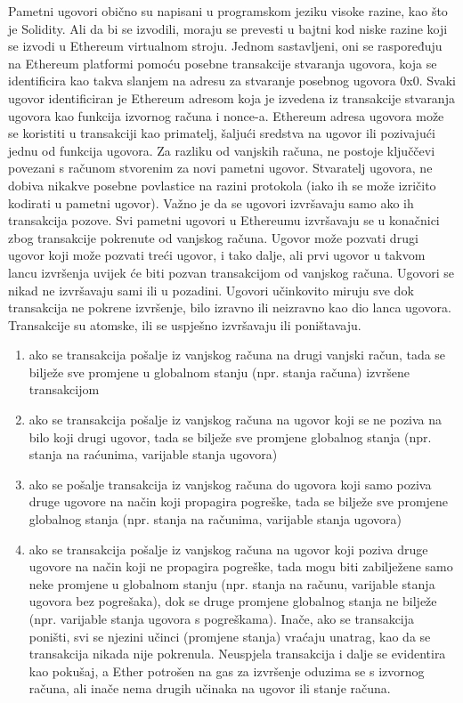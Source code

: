\documentclass[times, utf8, diplomski]{fer}
\begin{document}
Pametni ugovori obično su napisani u programskom jeziku visoke razine, kao što je Solidity. Ali da bi se izvodili, moraju se prevesti u bajtni kod niske razine koji se izvodi u Ethereum virtualnom stroju. Jednom sastavljeni, oni se raspoređuju na Ethereum platformi pomoću posebne transakcije stvaranja ugovora, koja se identificira kao takva slanjem na adresu za stvaranje posebnog ugovora 0x0. Svaki ugovor identificiran je Ethereum adresom koja je izvedena iz transakcije stvaranja ugovora kao funkcija izvornog računa i nonce-a. Ethereum adresa ugovora može se koristiti u transakciji kao primatelj, šaljući sredstva na ugovor ili pozivajući jednu od funkcija ugovora. Za razliku od vanjskih računa, ne postoje ključčevi povezani s računom stvorenim za novi
pametni ugovor. Stvaratelj ugovora, ne dobiva nikakve posebne povlastice na razini protokola (iako ih se može izričito kodirati u pametni ugovor).
Važno je da se ugovori izvršavaju samo ako ih transakcija pozove. Svi pametni ugovori u Ethereumu izvršavaju se u konačnici zbog transakcije pokrenute od vanjskog računa. Ugovor može pozvati drugi ugovor koji može pozvati treći ugovor, i tako dalje, ali prvi ugovor u takvom lancu izvršenja uvijek će biti pozvan transakcijom od vanjskog računa. Ugovori se nikad ne izvršavaju sami ili u pozadini. Ugovori učinkovito miruju sve dok transakcija ne pokrene izvršenje, bilo izravno ili neizravno kao dio lanca ugovora.  Transakcije su atomske,  ili se uspješno izvršavaju ili poništavaju.

\begin{enumerate}

\item ako se transakcija pošalje iz vanjskog računa na drugi vanjski račun, tada se bilježe sve promjene u globalnom stanju (npr. stanja računa) izvršene transakcijom

\item ako se transakcija pošalje iz vanjskog računa na ugovor koji se ne poziva na bilo koji drugi ugovor, tada se bilježe sve promjene globalnog stanja (npr. stanja na raćunima, varijable stanja ugovora)

\item ako se pošalje transakcija iz vanjskog računa do ugovora koji samo poziva druge ugovore na način koji propagira pogreške, tada se bilježe sve promjene globalnog stanja (npr. stanja na računima, varijable stanja ugovora)

\item ako se transakcija pošalje iz vanjskog računa na ugovor koji poziva druge ugovore na način koji ne propagira pogreške, tada mogu biti zabilježene samo neke promjene u globalnom stanju (npr. stanja na računu, varijable stanja ugovora bez pogrešaka), dok se druge promjene globalnog stanja ne bilježe (npr. varijable stanja ugovora s pogreškama). Inače, ako se transakcija poništi, svi se njezini učinci (promjene stanja) vraćaju unatrag, kao da se transakcija nikada nije pokrenula. Neuspjela transakcija i dalje se evidentira kao pokušaj, a Ether potrošen na gas za izvršenje oduzima se s izvornog računa, ali inače nema drugih učinaka na ugovor ili stanje računa.

\end{enumerate}
\end{document}
